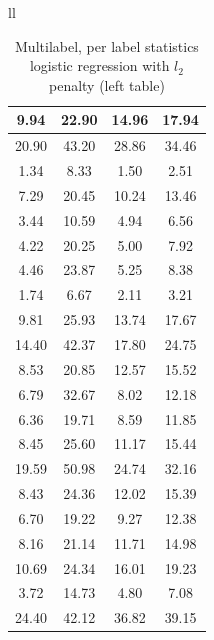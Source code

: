\documentclass{article} %
\begin{document}
\begin{table}[h]
\begin{center}
\begin{tabular}{ll}
\begin{tabular}{|c|c|c|c|}
 9.94	& 22.90	& 14.96	& 17.94	\\ \hline 
 20.90	& 43.20	& 28.86	& 34.46	\\ \hline 
 1.34	& 8.33	& 1.50	& 2.51	\\ \hline 
 7.29	& 20.45	& 10.24	& 13.46	\\ \hline 
 3.44	& 10.59	& 4.94	& 6.56	\\ \hline 
 4.22	& 20.25	& 5.00	& 7.92	\\ \hline 
 4.46	& 23.87	& 5.25	& 8.38	\\ \hline 
 1.74	& 6.67	& 2.11	& 3.21	\\ \hline 
 9.81	& 25.93	& 13.74	& 17.67	\\ \hline 
 14.40	& 42.37	& 17.80	& 24.75	\\ \hline 
 8.53	& 20.85	& 12.57	& 15.52	\\ \hline 
 6.79	& 32.67	& 8.02	& 12.18	\\ \hline 
 6.36	& 19.71	& 8.59	& 11.85	\\ \hline 
 8.45	& 25.60	& 11.17	& 15.44	\\ \hline 
 19.59	& 50.98	& 24.74	& 32.16	\\ \hline 
 8.43	& 24.36	& 12.02	& 15.39	\\ \hline 
 6.70	& 19.22	& 9.27	& 12.38	\\ \hline 
 8.16	& 21.14	& 11.71	& 14.98	\\ \hline 
 10.69	& 24.34	& 16.01	& 19.23	\\ \hline 
 3.72	& 14.73	& 4.80	& 7.08	\\ \hline 
 24.40	& 42.12	& 36.82	& 39.15	\\ \hline 
\end{tabular}
\end{tabular}
\caption{Multilabel, per label statistics logistic regression with $l_2$ penalty (left table)}
\end{center}
\end{table}


%
\end{document}
